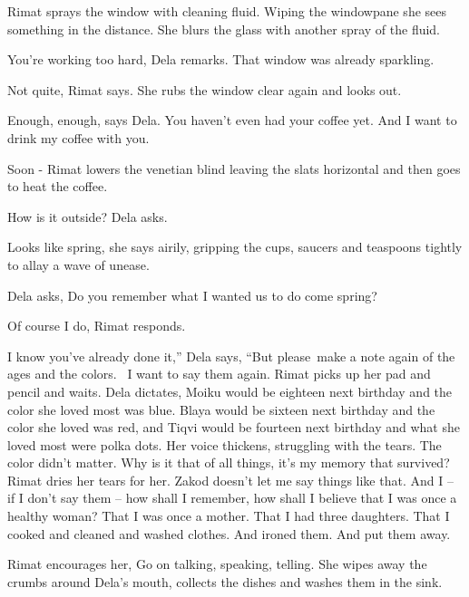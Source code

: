 \documentclass[letterpaper]{article}
\begin{document}
Rimat sprays the window with cleaning fluid. Wiping the windowpane she sees something{ }in the distance.
She blurs the glass with another spray of the fluid. 

{\textquotedbl}You're working too hard,{\textquotedbl} Dela remarks. {\textquotedbl}That window was already
sparkling.{\textquotedbl} 

{\textquotedbl}Not quite,{\textquotedbl} Rimat says. She rubs the window clear again and looks out. 

{\textquotedbl}Enough, enough,{\textquotedbl} says Dela. {\textquotedbl}You haven't even had your coffee yet.
And{ }I want to drink my coffee with you.{\textquotedbl} 

{\textquotedbl}Soon -{\textquotedbl} Rimat lowers the venetian blind leaving the slats horizontal and then goes to heat
the coffee.

{\textquotedbl}How is it outside?{\textquotedbl} Dela asks. 

{\textquotedbl}Looks like spring,{\textquotedbl} she says airily, gripping the cups, saucers and teaspoons tightly to
allay a wave of unease.

Dela asks, {\textquotedbl}Do you remember what I wanted us to do come spring?{\textquotedbl}

{\textquotedbl}Of course I do,{\textquotedbl} Rimat responds. 

{\textquotedbl}I know you've already done it,'' Dela says, ``But please~make a note again of the ages and the colors. ~I
want to say them again.{\textquotedbl} Rimat picks up her pad and pencil and waits. Dela dictates, {\textquotedbl}Moiku
would be eighteen next birthday and the color she loved most was blue. Blaya would be sixteen next birthday and the
color she loved was red, and Tiqvi would be fourteen next birthday and what she loved most were polka
dots.{\textquotedbl} Her voice thickens, struggling with the tears. {\textquotedbl}The color didn't matter. Why is it
that of all things, it's my memory that survived?{\textquotedbl} Rimat dries her tears for her. {\textquotedbl}Zakod
doesn't let me say things like that. And I -- if I don't say them -- how shall I remember, how shall I believe that I
was once a healthy woman? That I was once a mother. That I had three daughters. That I cooked and cleaned and washed
clothes. And ironed them. And put them away.{\textquotedbl} 

Rimat encourages her, {\textquotedbl}Go on talking, speaking, telling.{\textquotedbl} She wipes away the crumbs around
Dela's mouth, collects the dishes and washes them in the sink. 
\end{document}
